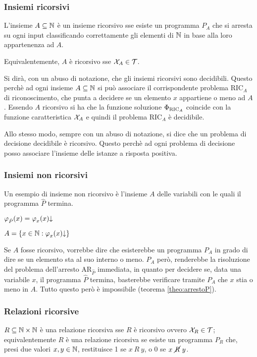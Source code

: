 \subsubsection{Insiemi ricorsivi}
L'insieme $A\subseteq\N$ è un insieme ricorsivo sse esiste un programma $P_A$ che si
arresta su ogni input classificando correttamente gli elementi di $\N$ in base alla
loro appartenenza ad $A$.

Equivalentemente, $A$ è ricorsivo sse $\X_A\in\ricTot$.

Si dirà, con un abuso di notazione, che gli insiemi ricorsivi sono decidibili. Questo
perchè ad ogni insieme $A\subseteq\N$ si può associare il corrispondente problema
$\text{RIC}_A$ di riconoscimento, che punta a decidere se un elemento $x$ appartiene o
meno ad $A$. Essendo $A$ ricorsivo si ha che la funzione soluzione $\fsol[\text{RIC}_A]$
coincide con la funzione caratteristica $\X_A$ e quindi il problema $\text{RIC}_A$ è
decidibile.

Allo stesso modo, sempre con un abuso di notazione, si dice che un problema di decisione
decidibile è ricorsivo. Questo perchè ad ogni problema di decisione posso associare
l'insieme delle istanze a risposta positiva.

\subsubsection{Insiemi non ricorsivi}
Un esempio di insieme non ricorsivo è l'insieme $A$ delle variabili con le quali il 
programma $\hat{P}$ termina.

\begin{minipage}{.49\textwidth}
    {$\semRAM_{\hat{P}}(x)=\semRAM_x(x)\termina$}
\end{minipage}
\begin{minipage}{.49\textwidth}
    $A = \{x\in\N: \semRAM_x(x)\termina \}$
\end{minipage}\vspace{.6em}

Se $A$ fosse ricorsivo, vorrebbe dire che esisterebbe un programma $P_A$ in grado di dire
se un elemento sta al suo interno o meno. $P_A$ però, renderebbe la risoluzione del 
problema dell'arresto $\text{AR}_{\hat{P}}$ immediata, in quanto per decidere se, data
una variabile $x$, il programma $\hat{P}$ termina, basterebbe verificare tramite $P_A$ che
$x$ stia o meno in $A$. Tutto questo però è impossibile (teorema \ref{theo:arrestoP}).

\subsubsection{Relazioni ricorsive}
$R\subseteq\N\times\N$ è una relazione ricorsiva sse $R$ è ricorsivo ovvero
$\X_R\in\ricTot$; equivalentemente $R$ è una relazione ricorsiva se esiste
un programma $P_R$ che, presi due valori $x,y\in\N$, restituisce 1 se $x\ R\ y$, o
0 se $x\ \cancel{R}\ y$.

